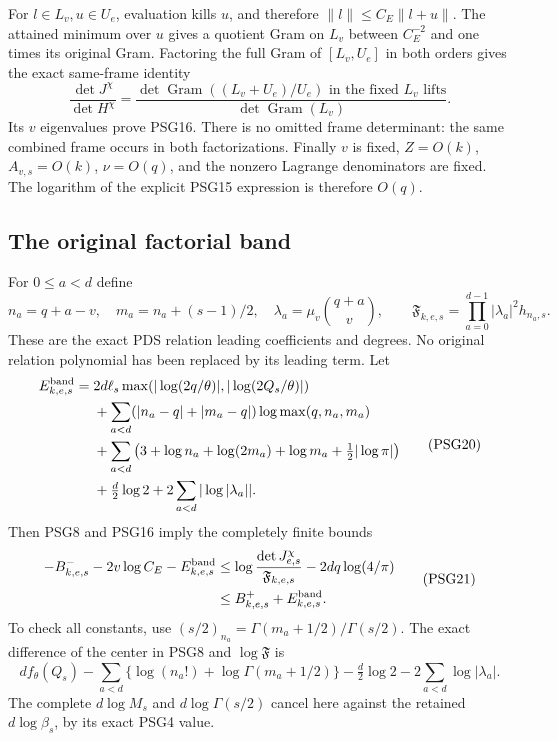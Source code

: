 \documentclass[10pt]{article}
\begin{document}
For \(l\in L_v,u\in U_e\), evaluation kills \(u\), and therefore
\(\|l\|\le C_E\|l+u\|\). The attained minimum over \(u\) gives
a quotient Gram on \(L_v\) between \(C_E^{-2}\) and one times
its original Gram. Factoring the full Gram of \([L_v,U_e]\)
in both orders gives the exact same-frame identity
\[
 \frac{\det J^\chi}{\det H^\chi}
 =\frac{\det\operatorname{Gram}((L_v+U_e)/U_e)
                    \text{ in the fixed }L_v\text{ lifts}}
        {\det\operatorname{Gram}(L_v)} .
 \tag{PSG18}
\]
Its \(v\) eigenvalues prove PSG16. There is no omitted frame
determinant: the same combined frame occurs in both factorizations.
Finally \(v\) is fixed, \(Z=O(k)\), \(A_{v,s}=O(k)\),
\(\nu=O(q)\), and the nonzero Lagrange denominators are fixed.
The logarithm of the explicit PSG15 expression is therefore \(O(q)\).

\subsection{The original factorial band}
For \(0\le a<d\) define
\[
 n_a=q+a-v,\quad m_a=n_a+(s-1)/2,\quad
 \lambda_a=\mu_v\binom{q+a}{v},\qquad
 \mathfrak F_{k,e,s}=\prod_{a=0}^{d-1}|\lambda_a|^2h_{n_a,s}.
 \tag{PSG19}
\]
These are the exact PDS relation leading coefficients and degrees.
No original relation polynomial has been replaced by its leading term.
Let
\[
\begin{split}
 E^{\rm band}_{k,e,s}
={}&2d\ell_s\max(|\log(2q/\theta)|,|\log(2Q_s/\theta)|)\\
 &+\sum_{a<d}(|n_a-q|+|m_a-q|)\log\max(q,n_a,m_a)\\
 &+\sum_{a<d}\left(3+\log n_a+\log(2m_a)+\log m_a
                                      +\tfrac12|\log\pi|\right)\\
 &+\tfrac d2\log2+2\sum_{a<d}|\log|\lambda_a|| .
\end{split}\tag{PSG20}
\]
Then PSG8 and PSG16 imply the completely finite bounds
\[
\begin{split}
 -B^-_{k,e,s}-2v\log C_E-E^{\rm band}_{k,e,s}
 &\le\log\frac{\det J^\chi_{e,s}}{\mathfrak F_{k,e,s}}
                                      -2dq\log(4/\pi)\\
 &\le B^+_{k,e,s}+E^{\rm band}_{k,e,s}.
\end{split}\tag{PSG21}
\]
To check all constants, use
\((s/2)_{n_a}=\Gamma(m_a+1/2)/\Gamma(s/2)\).
The exact difference of the center in PSG8 and \(\log\mathfrak F\) is
\[
 d f_\theta(Q_s)-\sum_{a<d}
       \{\log(n_a!)+\log\Gamma(m_a+1/2)\}
           -\tfrac d2\log2-2\sum_{a<d}\log|\lambda_a|.
 \tag{PSG22}
\]
The complete \(d\log M_s\) and \(d\log\Gamma(s/2)\) cancel here
against the retained \(d\log\beta_s\), by its exact PSG4 value.
\end{document}
